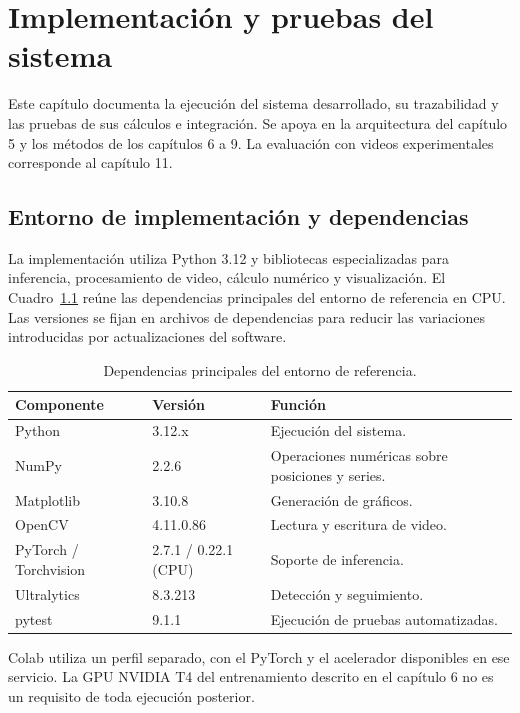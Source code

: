 \chapter{Implementación y pruebas del sistema}
\label{chap:implementacion-pruebas}

Este capítulo documenta la ejecución del sistema desarrollado, su trazabilidad y las pruebas de sus cálculos e integración. Se apoya en la arquitectura del capítulo 5 y los métodos de los capítulos 6 a 9. La evaluación con videos experimentales corresponde al capítulo 11.

\section{Entorno de implementación y dependencias}

La implementación utiliza Python 3.12 y bibliotecas especializadas para inferencia, procesamiento de video, cálculo numérico y visualización. El Cuadro~\ref{tab:entorno-implementacion} reúne las dependencias principales del entorno de referencia en CPU. Las versiones se fijan en archivos de dependencias para reducir las variaciones introducidas por actualizaciones del software.

\begin{table}[htbp]
 \centering
 \caption{Dependencias principales del entorno de referencia.}
 \label{tab:entorno-implementacion}
 \small
 \begin{tabularx}{\textwidth}{@{}l l X@{}}
  \toprule
  Componente & Versión & Función \\
  \midrule
  Python & 3.12.x & Ejecución del sistema. \\
  NumPy & 2.2.6 & Operaciones numéricas sobre posiciones y series. \\
  Matplotlib & 3.10.8 & Generación de gráficos. \\
  OpenCV & 4.11.0.86 & Lectura y escritura de video. \\
  PyTorch / Torchvision & 2.7.1 / 0.22.1 (CPU) & Soporte de inferencia. \\
  Ultralytics & 8.3.213 & Detección y seguimiento. \\
  pytest & 9.1.1 & Ejecución de pruebas automatizadas. \\
  \bottomrule
 \end{tabularx}
\end{table}

Colab utiliza un perfil separado, con el PyTorch y el acelerador disponibles en ese servicio. La GPU NVIDIA T4 del entrenamiento descrito en el capítulo 6 no es un requisito de toda ejecución posterior.

